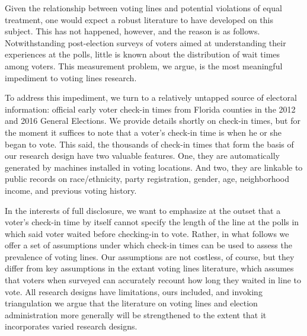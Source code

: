 \documentclass[12pt,titlepage]{article}
\begin{document}
Given the relationship between voting lines and potential violations
of equal treatment, one would expect a robust literature to
have developed on this subject.  This has not happened, however, and
the reason is as follows. Notwithstanding post-election surveys of
voters aimed at understanding their experiences at the polls, little
is known about the distribution of wait times among voters. This
measurement problem, we argue, is the most meaningful impediment to
voting lines research.

To address this impediment, we turn to a relatively untapped source of
electoral information: official early voter check-in times from
Florida counties in the 2012 and 2016 General Elections.  We provide
details shortly on check-in times, but for the moment it suffices to
note that a voter's check-in time is when he or she began to vote.
This said, the thousands of check-in times that form the basis of our
research design have two valuable features.  One, they are
automatically generated by machines installed in voting locations.
And two, they are linkable to public records on race/ethnicity, party
registration, gender, age, neighborhood income, and previous voting
history.

In the interests of full disclosure, we want to emphasize at the
outset that a voter's check-in time by itself cannot specify the
length of the line at the polls in which said voter waited before
checking-in to vote.  Rather, in what follows we offer a set of
assumptions under which check-in times can be used to assess the
prevalence of voting lines.  Our assumptions are not costless, of
course, but they differ from key assumptions in the extant voting
lines literature, which assumes that voters when surveyed can
accurately recount how long they waited in line to vote.  All research
designs have limitations, ours included, and invoking triangulation we
argue that the literature on voting lines and election administration
more generally will be strengthened to the extent that it incorporates
varied research designs.

\end{document}
